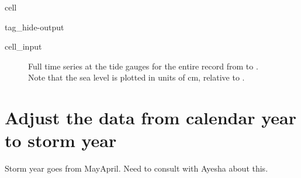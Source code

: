 \documentclass[letterpaper,10pt,english]{jupyterBook}
\begin{document}
\begin{sphinxuseclass}{cell}
\begin{sphinxuseclass}{tag_hide-output}
\begin{sphinxVerbatimInput}
\begin{sphinxuseclass}{cell_input}
\begin{sphinxVerbatim}[commandchars=\\\{\}]
\PYG{p}{[} \PYG{p}{]}



\end{sphinxVerbatim}

\end{sphinxuseclass}\end{sphinxVerbatimInput}

\end{sphinxuseclass}
\end{sphinxuseclass}
\begin{figure}[htbp]
\centering
\capstart

\noindent{}
\caption{Full time series at the  tide gauges for the entire record from  to . Note that the sea level is plotted in units of cm, relative to .}\label{\detokenize{notebooks/FloodFrequency:fig-ts-full}}\end{figure}


\section{Adjust the data from calendar year to storm year}
\label{\detokenize{notebooks/FloodFrequency:adjust-the-data-from-calendar-year-to-storm-year}}
\sphinxAtStartPar
Storm year goes from May\sphinxhyphen{}April. Need to consult with Ayesha about this.
\end{document}
